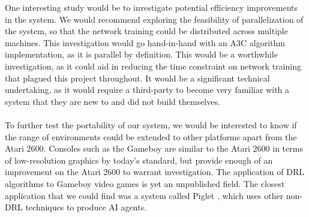 One interesting study would be to investigate potential efficiency improvements in the system. We would recommend exploring the feasibility of parallelization of the system, so that the network training could be distributed across multiple machines. This investigation would go hand-in-hand with an A3C algorithm implementation, as it is parallel by definition. This would be a worthwhile investigation, as it could aid in reducing the time constraint on network training that plagued this project throughout. It would be a significant technical undertaking, as it would require a third-party to become very familiar with a system that they are new to and did not build themselves. \paragraph{}

To further test the portability of our system, we would be interested to know if the range of environments could be extended to other platforms apart from the Atari 2600. Consoles such as the Gameboy \cite{gameboy} are similar to the Atari 2600 in terms of low-resolution graphics by today's standard, but provide enough of an improvement on the Atari 2600 to warrant investigation. The application of DRL algorithms to Gameboy video games is yet an unpublished field. The closest application that we could find was a system called Piglet \cite{piglet}, which uses other non-DRL techniques to produce AI agents.

